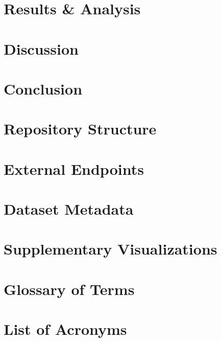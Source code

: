 \documentclass[12pt,a4paper,oneside]{book}
\begin{document}
\chapter{Results \& Analysis}


\chapter{Discussion}


\chapter{Conclusion}


\appendix
\chapter{Repository Structure}


\chapter{External Endpoints}


\chapter{Dataset Metadata}


\chapter{Supplementary Visualizations}


\chapter{Glossary of Terms}


\chapter{List of Acronyms}


\backmatter


\end{document}
